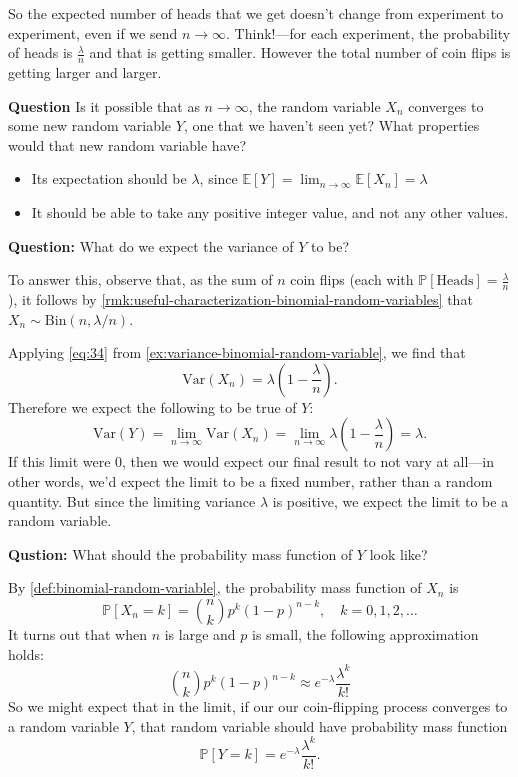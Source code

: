 \documentclass[10pt]{article}
\theoremstyle{definition}
\newcommand{\vt}{\vskip 5mm} %
\newcommand{\Fl}{\vt\noindent\textbf} %
\newcommand{\1}[1]{\textbf{1}_{\left[#1\right]}} %
\def\E{\mathbb{E}} %
\def\P{\mathbb{P}} %
\def\Var{\mathrm{Var}} %
\begin{document}
So the expected number of heads that we get doesn't change from experiment to experiment, even if we send
$n \to \infty$. Think!---for each experiment, the probability of heads is $\frac{\lambda}{n}$ and that is
getting smaller. However the total number of coin flips is getting larger and larger.

\Fl{Question} Is it possible that as $n \to \infty$, the random variable $X_{n}$ converges to some new
random variable $Y$, one that we haven't seen yet? What properties would that new
random variable have?


\begin{itemize}
  \item Its expectation should be $\lambda$, since $\E\left[Y
  \right]=\lim_{n\to\infty} \E\left[X_{n} \right] = \lambda$
  \item It should be able to take any positive integer value, and not any
  other values.
\end{itemize}

\Fl{Question:} What do we expect the variance of $Y$ to be?

To answer this, observe that, as the sum of $n$ coin flips (each with
$\P\left[\text{Heads} \right]=\frac{\lambda}{n}$), it follows by
\cref{rmk:useful-characterization-binomial-random-variables} that
$X_{n}\sim \text{Bin}(n,\lambda/n)$.

Applying \cref{eq:34} from \cref{ex:variance-binomial-random-variable}, we
find that
\begin{equation*}
  \Var(X_{n}) = \lambda\left( 1-\frac{\lambda}{n} \right).
\end{equation*}
Therefore we expect the following to be true of $Y$:
\begin{equation*}
  \Var(Y) = \lim_{n\to\infty} \Var(X_{n}) = \lim_{n\to\infty} \lambda\left( 1-\frac{\lambda}{n} \right) = \lambda.
\end{equation*}
If this limit were $0$, then we would expect our final result to not vary at
all---in other words, we'd expect the limit to be a fixed number, rather than
a random quantity. But since the limiting variance $\lambda$ is positive, we
expect the limit to be a random variable. 

\Fl{Qustion:} What should the probability mass function of $Y$ look like?


By \cref{def:binomial-random-variable}, the probability mass function of $X_{n}$
is
\begin{equation*}
  \P\left[X_{n} = k \right] = {n\choose k }p^{k}(1-p)^{n-k}, \quad k=0,1,2,\ldots
\end{equation*}
It turns out that when $n$ is large and $p$ is small, the following
approximation holds:
\begin{equation*}
  {n\choose k }p^{k}(1-p)^{n-k} \approx e^{-\lambda}\frac{\lambda^{k}}{k!}
\end{equation*}
So we might expect that in the limit, if our our coin-flipping process
converges to a random variable $Y$, that random variable should have
probability mass function
\begin{equation*}
  \P\left[Y=k \right] = e^{-\lambda}\frac{\lambda^{k}}{k!}.
\end{equation*}
\end{document}
